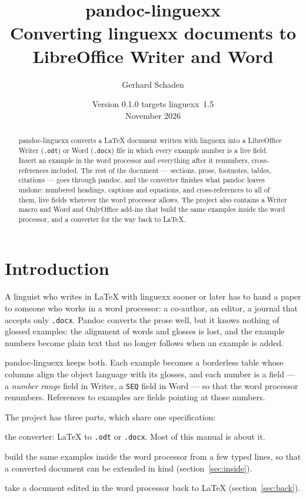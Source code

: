 \documentclass[11pt,a4paper]{article}
\title{\textbf{pandoc-linguexx}\\[4pt]
  \large Converting linguexx documents to LibreOffice Writer and Word}
\author{Gerhard Schaden}
\date{Version 0.1.0 \quad\textbullet\quad targets linguexx~1.5\\ November 2026}
\newcommand{\file}[1]{\texttt{#1}}
\newcommand{\prog}[1]{\textsf{#1}}
\newcommand{\pkg}[1]{\textsf{#1}}
\begin{document}
\maketitle

\begin{abstract}\noindent
\prog{pandoc-linguexx} converts a \LaTeX{} document written with
\pkg{linguexx} into a LibreOffice Writer (\file{.odt}) or Word (\file{.docx})
file in which every example number is a live field. Insert an example in
the word processor and everything after it renumbers, cross-references
included. The rest of the document --- sections, prose, footnotes, tables,
citations --- goes through pandoc, and the converter finishes what pandoc
leaves undone: numbered headings, captions and equations, and
cross-references to all of them, live fields wherever the word processor
allows. The project also contains a Writer macro
and Word and OnlyOffice add-ins that build the same examples inside the
word processor, and a converter for the way back to \LaTeX.
\end{abstract}

\tableofcontents

\section{Introduction}

A linguist who writes in \LaTeX{} with \pkg{linguexx} sooner or later has to
hand a paper to someone who works in a word processor: a co-author, an
editor, a journal that accepts only \file{.docx}. Pandoc converts the prose
well, but it knows nothing of glossed examples: the alignment of words and
glosses is lost, and the example numbers become plain text that no longer
follows when an example is added.

\prog{pandoc-linguexx} keeps both. Each example becomes a borderless table
whose columns align the object language with its glosses, and each number is
a field --- a \emph{number range} field in Writer, a \texttt{SEQ} field in
Word --- so that the word processor renumbers. References to examples are
fields pointing at those numbers.

The project has three parts, which share one specification:
\begin{description}[style=nextline,leftmargin=1.5em]
\item[\prog{linguexx2odt}] the converter: \LaTeX{} to \file{.odt} or
  \file{.docx}. Most of this manual is about it.
\item[The Writer macro and the Word and OnlyOffice add-ins] build the same
  examples inside the word processor from a few typed lines, so that a
  converted document can be extended in kind (section~\ref{sec:inside}).
\item[\prog{docx2linguexx} and \prog{odt2linguexx}] take a document edited
  in the word processor back to \LaTeX{} (section~\ref{sec:back}).
\end{description}
\end{document}
